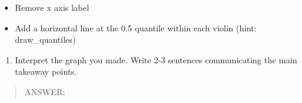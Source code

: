 \documentclass[]{article}
\providecommand{\tightlist}{%
  \setlength{\itemsep}{0pt}\setlength{\parskip}{0pt}}
\begin{document}
\begin{itemize}
\tightlist
\item
  Remove x axis label
\item
  Add a horizontal line at the 0.5 quantile within each violin (hint:
  draw\_quantiles)
\end{itemize}

\begin{enumerate}
\def\labelenumi{\arabic{enumi}.}
\setcounter{enumi}{11}
\tightlist
\item
  Interpret the graph you made. Write 2-3 sentences communicating the
  main takeaway points.
\end{enumerate}

\begin{quote}
ANSWER:
\end{quote}
\end{document}
